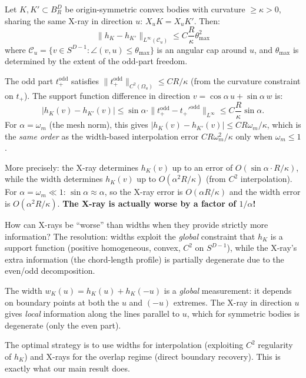 \begin{proposition}
\label{prop:parity}
Let $K, K' \subset B_R^D$ be origin-symmetric convex bodies with curvature $\geq \kappa > 0$, sharing the same X-ray in direction $u$: $X_u K = X_u K'$. Then:
\[
  \|h_K - h_{K'}\|_{L^\infty(\mathcal{C}_u)} \leq C \frac{R}{\kappa} \theta_{\max}^2
\]
where $\mathcal{C}_u = \{v \in S^{D-1} : \angle(v, u) \leq \theta_{\max}\}$ is an angular cap around $u$, and $\theta_{\max}$ is determined by the extent of the odd-part freedom.

The odd part $t_+^{\mathrm{odd}}$ satisfies $\|t_+^{\mathrm{odd}}\|_{C^2(\Omega_u)} \leq C R / \kappa$ (from the curvature constraint on $t_+$). The support function difference in direction $v = \cos\alpha \, u + \sin\alpha \, w$ is:
\[
  |h_K(v) - h_{K'}(v)| \leq \sin\alpha \cdot \|t_+^{\mathrm{odd}} - t_{+}'^{\mathrm{odd}}\|_{L^\infty} \leq C \frac{R}{\kappa} \sin\alpha.
\]
For $\alpha = \omega_m$ (the mesh norm), this gives $|h_K(v) - h_{K'}(v)| \leq C R \omega_m / \kappa$, which is the \emph{same order} as the width-based interpolation error $C R \omega_m^2 / \kappa$ only when $\omega_m \leq 1$.

More precisely: the X-ray determines $h_K(v)$ up to an error of $O(\sin\alpha \cdot R/\kappa)$, while the width determines $h_K(v)$ up to $O(\alpha^2 R / \kappa)$ (from $C^2$ interpolation). For $\alpha = \omega_m \ll 1$: $\sin\alpha \approx \alpha$, so the X-ray error is $O(\alpha R/\kappa)$ and the width error is $O(\alpha^2 R/\kappa)$. \textbf{The X-ray is actually worse by a factor of $1/\alpha$!}
\end{proposition}

\begin{remark}
How can X-rays be ``worse'' than widths when they provide strictly more information? The resolution: widths exploit the \emph{global} constraint that $h_K$ is a support function (positive homogeneous, convex, $C^2$ on $S^{D-1}$), while the X-ray's extra information (the chord-length profile) is partially degenerate due to the even/odd decomposition.

The width $w_K(u) = h_K(u) + h_K(-u)$ is a \emph{global} measurement: it depends on boundary points at both the $u$ and $(-u)$ extremes. The X-ray in direction $u$ gives \emph{local} information along the lines parallel to $u$, which for symmetric bodies is degenerate (only the even part).

The optimal strategy is to use widths for interpolation (exploiting $C^2$ regularity of $h_K$) and X-rays for the overlap regime (direct boundary recovery). This is exactly what our main result does.
\end{remark}

